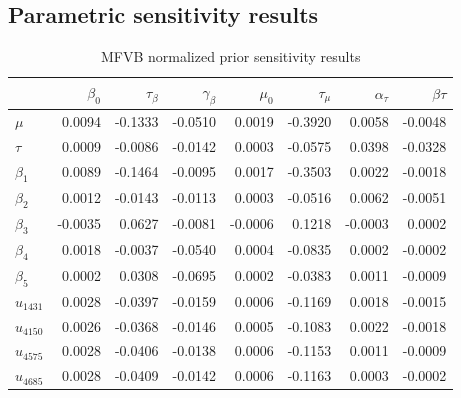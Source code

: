 \documentclass{article}\usepackage[]{graphicx}\usepackage[]{color}
\theoremstyle{plain}
\theoremstyle{definition}
\theoremstyle{plain}
\theoremstyle{plain}
\theoremstyle{plain}
\theoremstyle{plain}
\begin{document}
\subsection{Parametric sensitivity results\label{subsec:glmm_sensitivity}}

\begin{table}
\begin{center}%
\begin{tabular}{lrrrrrrr}
  \hline
  & $\beta_{0}$ & $\tau_{\beta}$ & $\gamma_{\beta}$ & $\mu_0$ & $\tau_{\mu}$ & $\alpha_{\tau}$ & $\beta{\tau}$ \\ 
  \hline
$\mu$ & 0.0094 & -0.1333 & -0.0510 & 0.0019 & -0.3920 & 0.0058 & -0.0048 \\ 
  $\tau$ & 0.0009 & -0.0086 & -0.0142 & 0.0003 & -0.0575 & 0.0398 & -0.0328 \\ 
  $\beta_{1}$ & 0.0089 & -0.1464 & -0.0095 & 0.0017 & -0.3503 & 0.0022 & -0.0018 \\ 
  $\beta_{2}$ & 0.0012 & -0.0143 & -0.0113 & 0.0003 & -0.0516 & 0.0062 & -0.0051 \\ 
  $\beta_{3}$ & -0.0035 & 0.0627 & -0.0081 & -0.0006 & 0.1218 & -0.0003 & 0.0002 \\ 
  $\beta_{4}$ & 0.0018 & -0.0037 & -0.0540 & 0.0004 & -0.0835 & 0.0002 & -0.0002 \\ 
  $\beta_{5}$ & 0.0002 & 0.0308 & -0.0695 & 0.0002 & -0.0383 & 0.0011 & -0.0009 \\ 
  $u_{1431}$ & 0.0028 & -0.0397 & -0.0159 & 0.0006 & -0.1169 & 0.0018 & -0.0015 \\ 
  $u_{4150}$ & 0.0026 & -0.0368 & -0.0146 & 0.0005 & -0.1083 & 0.0022 & -0.0018 \\ 
  $u_{4575}$ & 0.0028 & -0.0406 & -0.0138 & 0.0006 & -0.1153 & 0.0011 & -0.0009 \\ 
  $u_{4685}$ & 0.0028 & -0.0409 & -0.0142 & 0.0006 & -0.1163 & 0.0003 & -0.0002 \\ 
   \hline
\end{tabular}
\end{center}
\caption{MFVB normalized prior sensitivity results\label{tab:prior_sens}}
\end{table}
\end{document}
